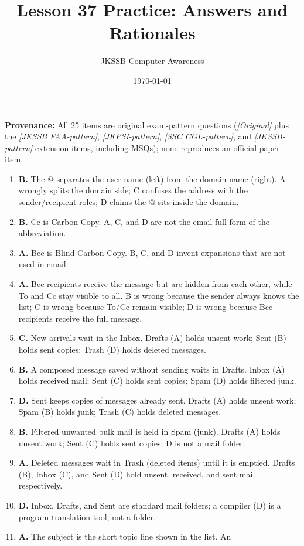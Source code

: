 \documentclass[11pt]{article}
\title{Lesson 37 Practice: Answers and Rationales}
\author{JKSSB Computer Awareness}
\date{\today}
\begin{document}
\maketitle
\noindent\textbf{Provenance:} All 25 items are original exam-pattern questions (\textit{[Original]} plus the \textit{[JKSSB FAA-pattern]}, \textit{[JKPSI-pattern]}, \textit{[SSC CGL-pattern]}, and \textit{[JKSSB-pattern]} extension items, including MSQs); none reproduces an official paper item.
\begin{enumerate}[label=\textbf{Q\arabic*.}, leftmargin=*]
\item \textbf{B.} The @ separates the user name (left) from the domain name
  (right). A wrongly splits the domain side; C confuses the address with the
  sender/recipient roles; D claims the @ sits inside the domain.
\item \textbf{B.} Cc is Carbon Copy. A, C, and D are not the email full form
  of the abbreviation.
\item \textbf{A.} Bcc is Blind Carbon Copy. B, C, and D invent expansions
  that are not used in email.
\item \textbf{A.} Bcc recipients receive the message but are hidden from each
  other, while To and Cc stay visible to all. B is wrong because the sender
  always knows the list; C is wrong because To/Cc remain visible; D is wrong
  because Bcc recipients receive the full message.
\item \textbf{C.} New arrivals wait in the Inbox. Drafts (A) holds unsent
  work; Sent (B) holds sent copies; Trash (D) holds deleted messages.
\item \textbf{B.} A composed message saved without sending waits in Drafts.
  Inbox (A) holds received mail; Sent (C) holds sent copies; Spam (D) holds
  filtered junk.
\item \textbf{D.} Sent keeps copies of messages already sent. Drafts (A)
  holds unsent work; Spam (B) holds junk; Trash (C) holds deleted messages.
\item \textbf{B.} Filtered unwanted bulk mail is held in Spam (junk). Drafts
  (A) holds unsent work; Sent (C) holds sent copies; D is not a mail folder.
\item \textbf{A.} Deleted messages wait in Trash (deleted items) until it is
  emptied. Drafts (B), Inbox (C), and Sent (D) hold unsent, received, and
  sent mail respectively.
\item \textbf{D.} Inbox, Drafts, and Sent are standard mail folders; a
  compiler (D) is a program-translation tool, not a folder.
\item \textbf{A.} The subject is the short topic line shown in the list. An

\end{enumerate}
\end{document}
